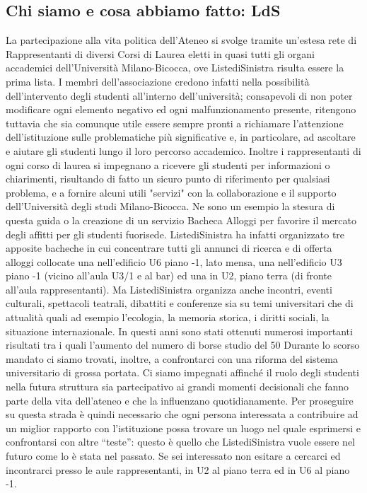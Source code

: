\subsection{Chi siamo e cosa abbiamo fatto: LdS}
La partecipazione alla vita politica dell'Ateneo si svolge tramite un'estesa rete di Rappresentanti di diversi Corsi di Laurea eletti in quasi tutti gli organi accademici dell'Università Milano-Bicocca, ove ListediSinistra risulta essere la prima lista. I membri dell'associazione credono infatti nella possibilità dell'intervento degli studenti all'interno dell'università; consapevoli di non poter modificare ogni elemento negativo ed ogni malfunzionamento presente, ritengono tuttavia che sia comunque utile essere sempre pronti a richiamare l'attenzione dell'istituzione sulle problematiche più significative e, in particolare, ad ascoltare e aiutare gli studenti lungo il loro percorso accademico.
Inoltre i rappresentanti di ogni corso di laurea si impegnano a ricevere gli studenti per informazioni o chiarimenti, risultando di fatto un sicuro punto di riferimento per qualsiasi problema, e a fornire alcuni utili "servizi" con la collaborazione e il supporto dell'Università degli studi Milano-Bicocca. Ne sono un esempio la stesura di questa guida o la creazione di un servizio Bacheca Alloggi per favorire il mercato degli affitti per gli studenti fuorisede.
ListediSinistra ha infatti organizzato tre apposite bacheche in cui concentrare tutti gli annunci di ricerca e di offerta alloggi collocate una nell'edificio U6 piano -1, lato mensa, una nell'edificio U3 piano -1 (vicino all'aula U3/1 e al bar) ed una in U2, piano terra (di fronte all’aula rappresentanti). Ma ListediSinistra organizza anche incontri, eventi culturali, spettacoli teatrali, dibattiti e conferenze sia su temi universitari che di attualità quali ad esempio l'ecologia, la memoria storica, i diritti sociali, la situazione internazionale.
In questi anni sono stati ottenuti numerosi importanti risultati tra i quali l'aumento del numero di borse studio del 50%
Durante lo scorso mandato ci siamo trovati, inoltre, a confrontarci con una riforma del sistema universitario di grossa portata. Ci siamo impegnati affinché il ruolo degli studenti nella futura struttura sia partecipativo ai grandi momenti decisionali che fanno parte della vita dell'ateneo e che la influenzano quotidianamente.
Per proseguire su questa strada è quindi necessario che ogni persona interessata a contribuire ad un miglior rapporto con l'istituzione possa trovare un luogo nel quale esprimersi e confrontarsi con altre “teste”: questo è quello che ListediSinistra vuole essere nel futuro come lo è stata nel passato. Se sei interessato non esitare a cercarci ed incontrarci presso le aule rappresentanti, in U2 al piano terra ed in U6 al piano -1.

